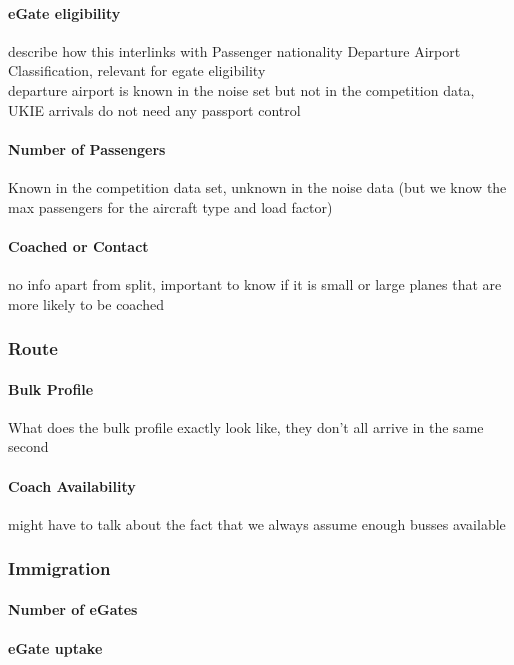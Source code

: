 \documentclass[10pt]{article}
\begin{document}
\paragraph{eGate eligibility}
describe how this interlinks with Passenger nationality Departure Airport Classification, relevant for egate eligibility \\
 departure airport is known in the noise set but not in the competition data, UKIE arrivals do not need any passport control

\paragraph{Number of Passengers}
Known in the competition data set, unknown in the noise data (but we know the max passengers for the aircraft type and load factor)

\paragraph{Coached or Contact}
no info apart from split, important to know if it is small or large planes that are more likely to be coached

\subsubsection{Route}

\paragraph{Bulk Profile} 
What does the bulk profile exactly look like, they don't all arrive in the same second 

\paragraph{Coach Availability}
might have to talk about the fact that we always assume enough busses available


\subsubsection{Immigration}

\paragraph{Number of eGates}

\paragraph{eGate uptake}
\end{document}
